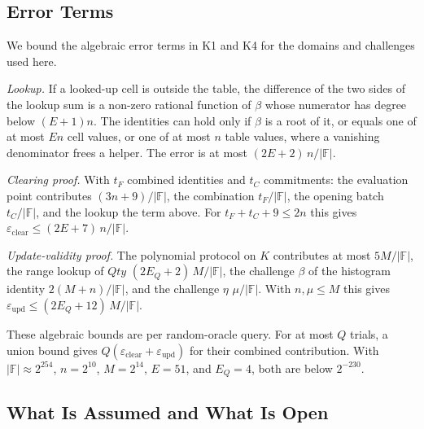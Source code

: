 \subsection{Error Terms}
\label{app:zq-security-errors}

We bound the algebraic error terms in K1 and K4 for the domains and challenges used here.

\emph{Lookup.} If a looked-up cell is outside the table, the difference of the two sides of the lookup sum is a non-zero rational function of \(\beta\) whose numerator has degree below \((E+1)n\). The identities can hold only if \(\beta\) is a root of it, or equals one of at most \(En\) cell values, or one of at most \(n\) table values, where a vanishing denominator frees a helper. The error is at most \((2E+2)\,n/|\mathbb{F}|\).

\emph{Clearing proof.} With \(t_F\) combined identities and \(t_C\) commitments: the evaluation point contributes \((3n+9)/|\mathbb{F}|\), the combination \(t_F/|\mathbb{F}|\), the opening batch \(t_C/|\mathbb{F}|\), and the lookup the term above. For \(t_F + t_C + 9 \le 2n\) this gives \(\varepsilon_{\mathrm{clear}} \le (2E+7)\,n/|\mathbb{F}|\).

\emph{Update-validity proof.} The polynomial protocol on \(K\) contributes at most \(5M/|\mathbb{F}|\), the range lookup of \(Qty\) \((2E_Q+2)\,M/|\mathbb{F}|\), the challenge \(\beta\) of the histogram identity \(2(M+n)/|\mathbb{F}|\), and the challenge \(\eta\) \(\mu/|\mathbb{F}|\). With \(n, \mu \le M\) this gives \(\varepsilon_{\mathrm{upd}} \le (2E_Q+12)\,M/|\mathbb{F}|\).

These algebraic bounds are per random-oracle query. For at most \(Q\) trials, a union bound gives \(Q(\varepsilon_{\mathrm{clear}}+\varepsilon_{\mathrm{upd}})\) for their combined contribution. With \(|\mathbb{F}| \approx 2^{254}\), \(n = 2^{10}\), \(M = 2^{14}\), \(E = 51\), and \(E_Q = 4\), both are below \(2^{-230}\).

\subsection{What Is Assumed and What Is Open}
\label{app:zq-security-limits}


